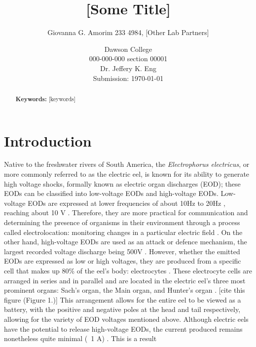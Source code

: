 \documentclass[letterpaper]{article}
\title{[Some Title]}
\author{Giovanna G. Amorim 233 4984, [Other Lab Partners]}
\date{Dawson College \\[15pt]
000-000-000 section 00001\\[15pt]
Dr. Jeffery K. Eng\\[15pt]
Submission: \today}
\begin{document}
\maketitle

\begin{abstract}
        
	\noindent\textbf{Keywords:} [keywords]
\end{abstract}

\tableofcontents

\newpage

\section{Introduction}
\label{sec:introduction}

Native to the freshwater rivers of South America, the \textit{Electrophorus electricus}, or more 
commonly referred to as the electric eel, is known for its ability to generate high voltage shocks,
formally known as electric organ discharges (EOD); these EODs can be classified into low-voltage 
EODs and high-voltage EODs. Low-voltage EODs are expressed at lower frequencies of about 10Hz to
20Hz \parencite{cataniaAstonishingBehaviorElectric2019}, reaching about 10 V \parencite{ElectricCircuits6ElectricEels2015}. 
Therefore, they are more practical for communication and determining the presence of organisms 
in their environment through a process called electrolocation: monitoring 
changes in a particular electric field \parencite{bennettComparativePhysiologyElectric1970}. 
On the other hand, high-voltage EODs are used as an attack or defence mechanism,
the largest recorded voltage discharge being 500V \parencite{ElectricCircuits6ElectricEels2015}.
However, whether the emitted EODs are expressed as low or high 
voltages, they are produced from a specific cell that makes up 80\% of the eel’s body: electrocytes
\parencite{carlsonAnimalBehaviorElectric2015}. These electrocyte cells are arranged in series and 
in parallel and are located in the electric eel’s three most prominent organs: Sach’s organ, the 
Main organ, and Hunter’s organ \parencite{ElectricCircuits6ElectricEels2015}. [cite this figure (Figure 1.)] This 
arrangement allows for the entire eel to be viewed as a battery, with the positive and negative 
poles at the head and tail respectively, allowing for the variety of EOD voltages mentioned above. 
Although electric eels have the potential to release high-voltage EODs, the current produced remains
nonetheless quite minimal (~1 A) \parencite{ElectricCircuits6ElectricEels2015}. This is a result 
\end{document}
